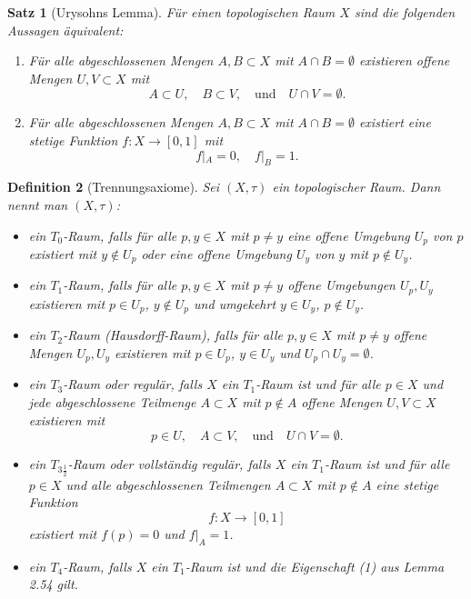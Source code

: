 \documentclass[a4paper,12pt]{article}
\theoremstyle{break}
\newtheorem{definition}{Definition}[section]
\newtheorem{theorem}[definition]{Satz}
\begin{document}
\begin{theorem}[Urysohns Lemma]
Für einen topologischen Raum $X$ sind die folgenden Aussagen äquivalent:
\begin{enumerate}
    \item Für alle abgeschlossenen Mengen $A, B \subset X$ mit $A \cap B = \emptyset$ existieren offene Mengen $U, V \subset X$ mit 
    \[
    A \subset U, \quad B \subset V, \quad \text{und} \quad U \cap V = \emptyset.
    \]
    
    \item Für alle abgeschlossenen Mengen $A, B \subset X$ mit $A \cap B = \emptyset$ existiert eine stetige Funktion $f: X \to [0,1]$ mit 
    \[
    f|_A = 0, \quad f|_B = 1.
    \]
\end{enumerate}
\end{theorem}

\begin{definition}[Trennungsaxiome]
Sei $(X, \tau)$ ein topologischer Raum. Dann nennt man $(X, \tau)$:
\begin{itemize}
    \item ein \emph{$T_0$-Raum}, falls für alle $p, y \in X$ mit $p \neq y$ eine offene Umgebung $U_p$ von $p$ existiert mit $y \notin U_p$ oder eine offene Umgebung $U_y$ von $y$ mit $p \notin U_y$.
    
    \item ein \emph{$T_1$-Raum}, falls für alle $p, y \in X$ mit $p \neq y$ offene Umgebungen $U_p, U_y$ existieren mit $p \in U_p$, $y \notin U_p$ und umgekehrt $y \in U_y$, $p \notin U_y$.
    
    \item ein \emph{$T_2$-Raum} (Hausdorff-Raum), falls für alle $p, y \in X$ mit $p \neq y$ offene Mengen $U_p, U_y$ existieren mit $p \in U_p$, $y \in U_y$ und $U_p \cap U_y = \emptyset$.
    
    \item ein \emph{$T_3$-Raum} oder \emph{regulär}, falls $X$ ein $T_1$-Raum ist und für alle $p \in X$ und jede abgeschlossene Teilmenge $A \subset X$ mit $p \notin A$ offene Mengen $U, V \subset X$ existieren mit 
    \[
    p \in U, \quad A \subset V, \quad \text{und} \quad U \cap V = \emptyset.
    \]

    \item ein \emph{$T_{3\frac{1}{2}}$-Raum} oder \emph{vollständig regulär}, falls $X$ ein $T_1$-Raum ist und für alle $p \in X$ und alle abgeschlossenen Teilmengen $A \subset X$ mit $p \notin A$ eine stetige Funktion 
    \[
    f: X \to [0,1]
    \]
    existiert mit $f(p) = 0$ und $f|_A = 1$.

    \item ein \emph{$T_4$-Raum}, falls $X$ ein $T_1$-Raum ist und die Eigenschaft (1) aus Lemma 2.54 gilt.
\end{itemize}
\end{definition}
\end{document}
